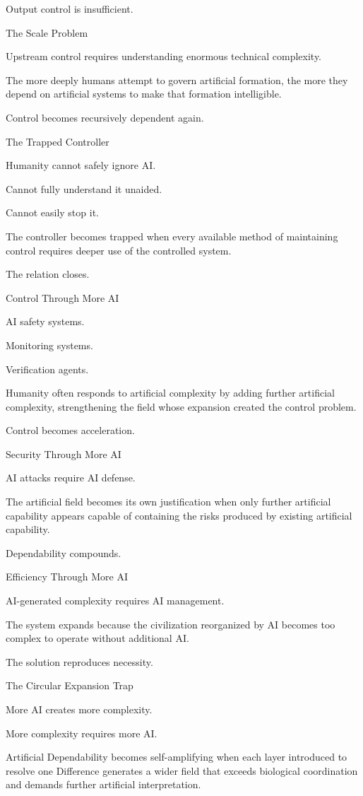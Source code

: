 Output control is insufficient.

The Scale Problem

Upstream control requires understanding enormous technical complexity.

The more deeply humans attempt to govern artificial formation, the more they depend on artificial systems to make that formation intelligible.

Control becomes recursively dependent again.

The Trapped Controller

Humanity cannot safely ignore AI.

Cannot fully understand it unaided.

Cannot easily stop it.

The controller becomes trapped when every available method of maintaining control requires deeper use of the controlled system.

The relation closes.

Control Through More AI

AI safety systems.

Monitoring systems.

Verification agents.

Humanity often responds to artificial complexity by adding further artificial complexity, strengthening the field whose expansion created the control problem.

Control becomes acceleration.

Security Through More AI

AI attacks require AI defense.

The artificial field becomes its own justification when only further artificial capability appears capable of containing the risks produced by existing artificial capability.

Dependability compounds.

Efficiency Through More AI

AI-generated complexity requires AI management.

The system expands because the civilization reorganized by AI becomes too complex to operate without additional AI.

The solution reproduces necessity.

The Circular Expansion Trap

More AI creates more complexity.

More complexity requires more AI.

Artificial Dependability becomes self-amplifying when each layer introduced to resolve one Difference generates a wider field that exceeds biological coordination and demands further artificial interpretation.


